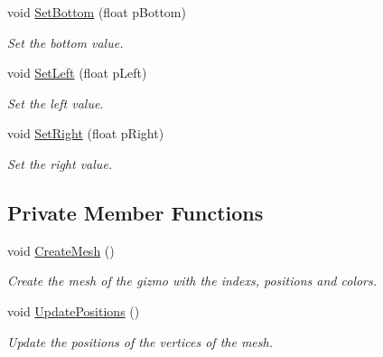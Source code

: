 \begin{DoxyCompactItemize}
void \hyperlink{class_orthographic_camera_aaa433e475cfbec1455f4dab5b3f5b224}{Set\+Bottom} (float p\+Bottom)
\begin{DoxyCompactList}\small\item\em Set the bottom value. \end{DoxyCompactList}\item 
void \hyperlink{class_orthographic_camera_addc3594ec0843b3936a6830de8f16a16}{Set\+Left} (float p\+Left)
\begin{DoxyCompactList}\small\item\em Set the left value. \end{DoxyCompactList}\item 
void \hyperlink{class_orthographic_camera_a361f95d002589579563791a2b6fcb1f0}{Set\+Right} (float p\+Right)
\begin{DoxyCompactList}\small\item\em Set the right value. \end{DoxyCompactList}\end{DoxyCompactItemize}
\subsection*{Private Member Functions}
\begin{DoxyCompactItemize}
\item 
void \hyperlink{class_orthographic_camera_a5edb0b3f645e77d086024157ef684eea}{Create\+Mesh} ()
\begin{DoxyCompactList}\small\item\em Create the mesh of the gizmo with the indexs, positions and colors. \end{DoxyCompactList}\item 
void \hyperlink{class_orthographic_camera_ad774f1e383f99a94e3f733ecaa814e80}{Update\+Positions} ()
\begin{DoxyCompactList}\small\item\em Update the positions of the vertices of the mesh. \end{DoxyCompactList}\end{DoxyCompactItemize}
